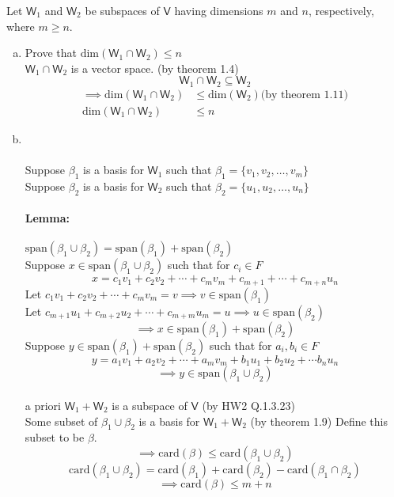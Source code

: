 Let $\mathsf{W}_1$ and $\mathsf{W}_2$ be subspaces of $\mathsf{V}$
having dimensions $m$ and $n$, respectively, where $m\geq n$.
\begin{enumerate}[(a)]
\item Prove that $\text{dim}(\mathsf{W}_1\cap\mathsf{W}_2) \leq n$
\\$\mathsf{W}_1\cap\mathsf{W}_2$ is a vector space. (by theorem 1.4)
\begin{equation}
\mathsf{W}_1\cap\mathsf{W}_2 \subseteq \mathsf{W}_2
\end{equation}
\begin{align}
\implies \text{dim}(\mathsf{W}_1\cap\mathsf{W}_2) &\leq
\text{dim}(\mathsf{W}_2) \text{(by theorem 1.11)}\\
\text{dim}(\mathsf{W}_1\cap\mathsf{W}_2) &\leq n
\end{align}

\item \hfill\\
\\Suppose $\beta_1$ is a basis for $\mathsf{W}_1$ such that
$\beta_1=\{v_1,v_2,\dots,v_m\}$
\\Suppose $\beta_2$ is a basis for $\mathsf{W}_2$ such that
$\beta_2=\{u_1,u_2,\dots,u_n\}$
\paragraph{Lemma:} $\text{span}(\beta_1\cup \beta_2) =
\text{span}(\beta_1) + \text{span}(\beta_2)$
\\Suppose $x\in \text{span}(\beta_1\cup\beta_2)$ such that for $c_i
\in F$ 
\[x=c_1v_1+c_2v_2+\cdots+c_mv_m +c_{m+1} +\cdots+c_{m+n}u_n\]
Let $c_1v_1+c_2v_2+\cdots+c_mv_m = v \implies v \in
\text{span}(\beta_1)$
\\Let $c_{m+1}u_1+c_{m+2}u_2+\cdots+c_{m+m}u_m = u \implies u \in
\text{span}(\beta_2)$
\begin{equation}
\implies x\in \text{span}(\beta_1) + \text{span}(\beta_2)
\end{equation}
Suppose $y\in \text{span}(\beta_1) + \text{span}(\beta_2)$ such that
for $a_i,b_i \in F$ 
\[y = a_1v_1+a_2v_2+\cdots+a_mv_m+b_1u_1+b_2u_2+\cdots b_nu_n \]
\begin{equation}
\implies y \in \text{span}(\beta_1\cup\beta_2)
\end{equation}
\\a priori $\mathsf{W}_1+\mathsf{W}_2$ is a subspace of $\mathsf{V}$
(by HW2 Q.1.3.23)
\\Some subset of $\beta_1\cup\beta_2$ is a basis for
$\mathsf{W}_1+\mathsf{W}_2$ (by theorem 1.9) Define this subset to be
$\beta$.
\begin{equation}
\implies \text{card}(\beta) \leq \text{card}(\beta_1\cup\beta_2)
\end{equation}
\begin{equation}
\text{card}(\beta_1\cup\beta_2) = \text{card}(\beta_1) +\text{card}(\beta_2)-\text{card}(\beta_1\cap\beta_2)
\end{equation}
\begin{equation}
\implies \text{card}(\beta) \leq m+n
\end{equation}
\end{enumerate}
